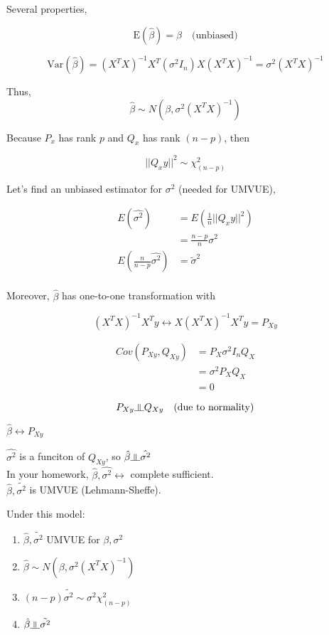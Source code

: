 \documentclass[11pt,fleqn]{book} %
\newcommand{\indep}{\rotatebox[origin=c]{90}{$\models$}}
\begin{document}
Several properties, 

$$\text{E}(\hat{\beta}) = \beta \quad \text{(unbiased)}$$

$$\text{Var}(\hat{\beta}) = (X^TX)^{-1} X^T (\sigma^2 I_n) X (X^TX)^{-1} = \sigma^2 (X^TX)^{-1} $$

Thus, 
$$\hat{\beta} \sim N(\beta, \sigma^2 (X^TX)^{-1})$$

Because $P_x$ has rank $p$ and $Q_x$ has rank $(n-p)$, then

	$$||Q_x y ||^2 \sim \chi^2_{(n-p)} $$

	Let's find an unbiased estimator for $\sigma^2$ (needed for UMVUE), 

	\begin{align*}
		E(\hat{\sigma^2}) &= E(\frac{1}{n}||Q_x y ||^2)\\
			&= \frac{n-p}{n} \sigma^2\\
			E\left(\frac{n}{n-p} \hat{\sigma^2}\right) &= \tilde{\sigma}^2\\
	\end{align*}

	Moreover, $\hat{\beta}$ has one-to-one transformation with 

	$$(X^TX)^{-1} X^T y \leftrightarrow X (X^TX)^{-1} X^T y = P_{Xy}$$

	\begin{align*}
		Cov(P_{Xy}, Q_{Xy}) &= P_X \sigma^2 I_n Q_X\\
		&= \sigma^2 P_X Q_X\\
		&= 0
	\end{align*}

	$$P_{Xy} \indep Q_{Xy} \quad \text{(due to normality)} $$

	$\hat{\beta} \leftrightarrow P_{Xy}$

	$\hat{\sigma^2}$ is a funciton of $Q_{Xy}$, so $\hat{\beta} \indep \hat{\sigma^2}$\\

	In your homework, $\hat{\beta}, \hat{\sigma^2} \leftrightarrow$ complete sufficient.\\

	$\hat{\beta}, \tilde{\sigma^2}$ is UMVUE (Lehmann-Sheffe).



\begin{theorem} Under this model:\\

	\begin{enumerate}
		\item $\hat{\beta}, \tilde{\sigma^2}$ UMVUE for $\beta, \sigma^2$
		\item $\hat{\beta} \sim N(\beta, \sigma^2 (X^TX)^{-1})$
		\item $(n-p)\tilde{\sigma^2} \sim \sigma^2 \chi^2_{(n-p)}$
		\item $\hat{\beta} \indep \tilde{\sigma^2}$
	\end{enumerate}

\end{theorem}
\end{document}
